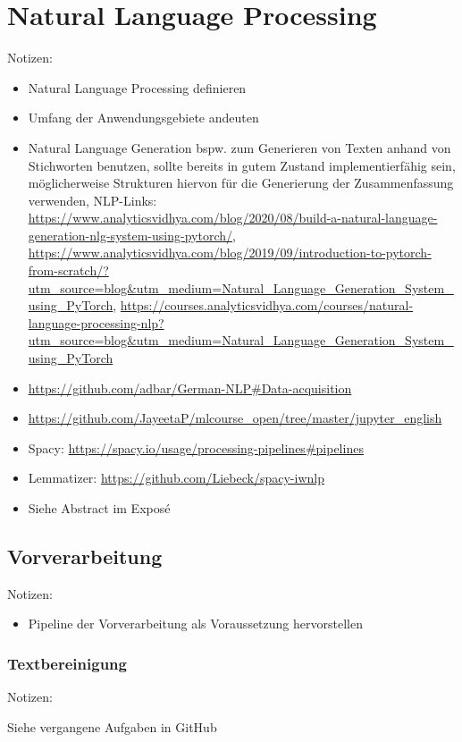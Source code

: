 \chapter{Natural Language Processing}
\thispagestyle{fancy}
\label{chap:Natural Language Processing}

Notizen:
\begin{itemize}
	\item Natural Language Processing definieren
	\item Umfang der Anwendungsgebiete andeuten
	\item Natural Language Generation bspw. zum Generieren von Texten anhand von Stichworten benutzen, sollte bereits in gutem Zustand implementierfähig sein, möglicherweise Strukturen hiervon für die Generierung der Zusammenfassung verwenden, NLP-Links: \url{https://www.analyticsvidhya.com/blog/2020/08/build-a-natural-language-generation-nlg-system-using-pytorch/}, \url{https://www.analyticsvidhya.com/blog/2019/09/introduction-to-pytorch-from-scratch/?utm_source=blog&utm_medium=Natural_Language_Generation_System_using_PyTorch}, \url{https://courses.analyticsvidhya.com/courses/natural-language-processing-nlp?utm_source=blog&utm_medium=Natural_Language_Generation_System_using_PyTorch}
	\item \url{https://github.com/adbar/German-NLP#Data-acquisition}
	\item \url{https://github.com/JayeetaP/mlcourse_open/tree/master/jupyter_english}
	\item Spacy: \url{https://spacy.io/usage/processing-pipelines#pipelines}
	\item Lemmatizer: \url{https://github.com/Liebeck/spacy-iwnlp}
	\item Siehe Abstract im Exposé
\end{itemize}


\section{Vorverarbeitung}
Notizen:
\begin{itemize}
	\item Pipeline der Vorverarbeitung als Voraussetzung hervorstellen
\end{itemize}


\subsection{Textbereinigung}
Notizen:
	\item Siehe vergangene Aufgaben in GitHub


